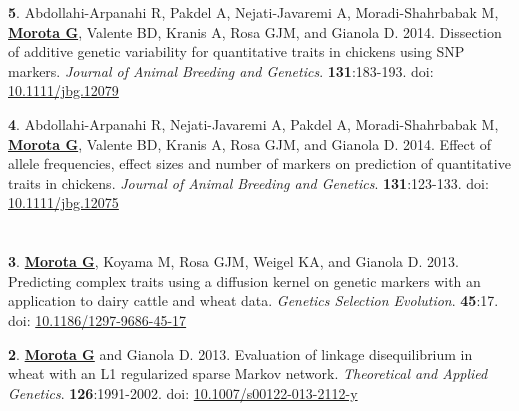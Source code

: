\documentclass[margin,line,10pt]{res}
\newenvironment{list1}{
  \begin{list}{\ding{113}}{%
      \setlength{\itemsep}{0in}
      \setlength{\parsep}{0in} \setlength{\parskip}{0in}
      \setlength{\topsep}{0in} \setlength{\partopsep}{0in} 
      \setlength{\leftmargin}{0.17in}}}{\end{list}}
\begin{document}
\begin{resume}
\begin{list1}
\vspace{0.5cm}

\item [{\bf 5}.]  Abdollahi-Arpanahi R, Pakdel A, Nejati-Javaremi A, Moradi-Shahrbabak M, 
     {\bf \underline{Morota G}}, Valente BD, Kranis A, Rosa GJM, and Gianola D. 2014.
     Dissection of additive genetic variability for quantitative traits in chickens using SNP markers. \emph{Journal of Animal Breeding and Genetics}. \textbf{131}:183-193. doi: \textcolor{blue}{\href{http://dx.doi.org/10.1111/jbg.12079}{10.1111/jbg.12079}}

\vspace{0.5cm}

\item [{\bf 4}.]  Abdollahi-Arpanahi R,  Nejati-Javaremi A,  Pakdel A, Moradi-Shahrbabak M, 
     {\bf \underline{Morota G}}, Valente BD, Kranis A, Rosa GJM, and Gianola D. 2014.   
     Effect of allele frequencies, effect sizes and number of markers on prediction of quantitative 
     traits in chickens. \emph{Journal of Animal Breeding and Genetics}. \textbf{131}:123-133. doi: \textcolor{blue}{\href{http://dx.doi.org/10.1111/jbg.12075}{10.1111/jbg.12075}}
\end{list1}



\section{}


\begin{list1}
\item [{\bf 3}.]  {\bf \underline{Morota G}}, Koyama M, Rosa GJM, Weigel KA, and Gianola D. 2013.
     Predicting complex traits using a diffusion kernel on genetic markers with an application to dairy cattle and wheat data. \emph{Genetics Selection Evolution}. {\bf 45}:17. doi: \textcolor{blue}{\href{http://dx.doi.org/10.1186/1297-9686-45-17}{10.1186/1297-9686-45-17}}

\vspace{0.5cm}

\item [{\bf 2}.] {\bf \underline{Morota G}} and Gianola D. 2013.  Evaluation of linkage disequilibrium in wheat with an L1 regularized sparse Markov network.
  \emph{Theoretical and Applied Genetics}. {\bf 126}:1991-2002. doi: \textcolor{blue}{\href{http://dx.doi.org/10.1007/s00122-013-2112-y}{10.1007/s00122-013-2112-y}}
\end{list1}



\end{resume}
\end{document}
